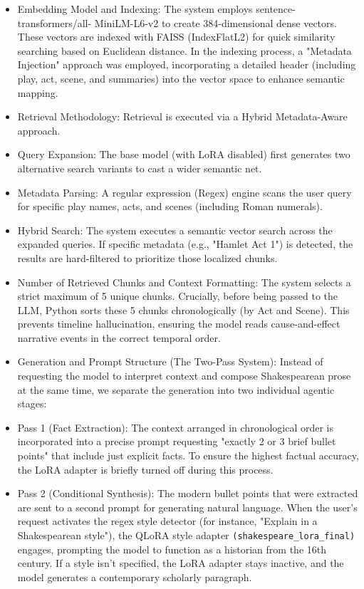 \documentclass[10pt,conference]{IEEEtran}
\begin{document}
\begin{itemize}
    \item Embedding Model and Indexing: The system employs sentence-transformers/all-
    MiniLM-L6-v2 to create 384-dimensional dense vectors. These vectors are 
    indexed with FAISS (IndexFlatL2) for quick similarity searching based on 
    Euclidean distance. In the indexing process, a "Metadata Injection" approach was 
    employed, incorporating a detailed header (including play, act, scene, and 
    summaries) into the vector space to enhance semantic mapping.
    \item Retrieval Methodology: Retrieval is executed via a Hybrid Metadata-Aware approach.
    \item Query Expansion: The base model (with LoRA disabled) first generates two alternative search variants to cast a wider semantic net.
    \item Metadata Parsing: A regular expression (Regex) engine scans the user query for specific play names, acts, and scenes (including Roman numerals).
    \item Hybrid Search: The system executes a semantic vector search across the expanded queries. If specific metadata (e.g., "Hamlet Act 1") is detected, the results are hard-filtered to prioritize those localized chunks.
    \item Number of Retrieved Chunks and Context Formatting: The system selects a strict maximum of 5 unique chunks. Crucially, before being passed to the LLM, Python sorts these 5 chunks chronologically (by Act and Scene). This prevents timeline hallucination, ensuring the model reads cause-and-effect narrative events in the correct temporal order.
    \item Generation and Prompt Structure (The Two-Pass System): Instead of requesting the model to interpret context and compose Shakespearean prose at the same time, we separate the generation into two individual agentic stages:
    \item Pass 1 (Fact Extraction): The context arranged in chronological order is incorporated into a precise prompt requesting "exactly 2 or 3 brief bullet points" that include just explicit facts. To ensure the highest factual accuracy, the LoRA adapter is briefly turned off during this process.

    \item Pass 2 (Conditional Synthesis): The modern bullet points that were extracted are sent to a second prompt for generating natural language. When the user's request activates the regex style detector (for instance, "Explain in a Shakespearean style"), the QLoRA style adapter
    \verb|(shakespeare_lora_final)|
    engages, prompting the model to function as a historian from the 16th century. If a style isn't specified, the LoRA adapter stays inactive, and the model generates a contemporary scholarly paragraph.
\end{itemize}
\end{document}

